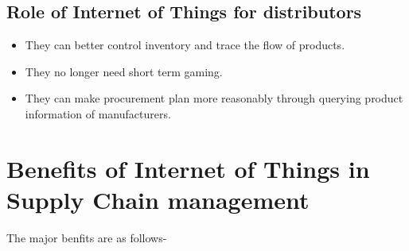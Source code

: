 \documentclass[12pt, a4paper]{report}
\begin{document}
\subsection{Role of Internet of Things for distributors}
\begin{itemize}
    \item They can better control inventory and trace the flow of products.
    \item They no longer need short term gaming.
    \item They can make procurement plan more reasonably through querying product information of manufacturers.
\end{itemize}

\section{Benefits of Internet of Things in Supply Chain management}
The major benfits are as follows-
\end{document}

